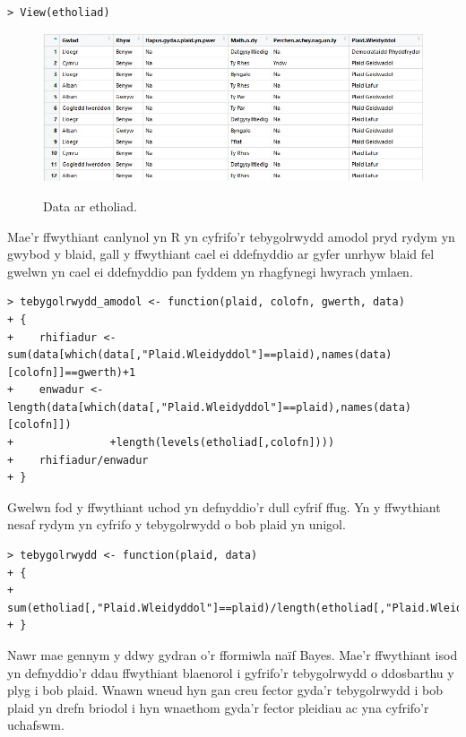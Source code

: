 \begin{verbatim}
> View(etholiad)
\end{verbatim}

\begin{figure}[H]
\begin{center}
\includegraphics[width=0.8\linewidth]{../img/data_dosbarthiad.jpg}
\label{fig:data_dosbarthiad}
\caption{Data ar etholiad.}
\end{center}
\end{figure}

Mae'r ffwythiant canlynol yn R yn cyfrifo'r tebygolrwydd amodol pryd rydym yn gwybod y blaid, gall y ffwythiant cael ei ddefnyddio ar gyfer unrhyw blaid fel gwelwn yn cael ei ddefnyddio pan fyddem yn rhagfynegi hwyrach ymlaen.

\begin{verbatim}
> tebygolrwydd_amodol <- function(plaid, colofn, gwerth, data)
+ {
+    rhifiadur <- sum(data[which(data[,"Plaid.Wleidyddol"]==plaid),names(data)[colofn]]==gwerth)+1 
+    enwadur <- length(data[which(data[,"Plaid.Wleidyddol"]==plaid),names(data)[colofn]])
+               +length(levels(etholiad[,colofn])))
+    rhifiadur/enwadur
+ }
\end{verbatim}

Gwelwn fod y ffwythiant uchod yn defnyddio'r dull cyfrif ffug. Yn y ffwythiant nesaf rydym yn cyfrifo y tebygolrwydd o bob plaid yn unigol.

\begin{verbatim}
> tebygolrwydd <- function(plaid, data)
+ {
+   sum(etholiad[,"Plaid.Wleidyddol"]==plaid)/length(etholiad[,"Plaid.Wleidyddol"])
+ }
\end{verbatim}

Nawr mae gennym y ddwy gydran o'r fformiwla na\"{i}f Bayes. Mae'r ffwythiant isod yn defnyddio'r ddau ffwythiant blaenorol i gyfrifo'r tebygolrwydd o ddosbarthu y plyg i bob plaid. Wnawn wneud hyn gan creu fector gyda'r tebygolrwydd i bob plaid yn drefn briodol i hyn wnaethom gyda'r fector pleidiau ac yna cyfrifo'r uchafswm.

